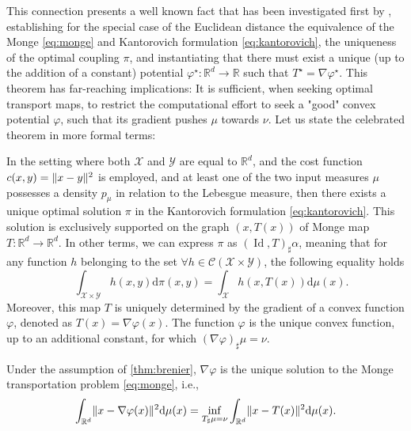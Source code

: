 This connection presents a well known fact that has been investigated first by \citeauthor{brenier1987decomposition}, establishing for the special case of the Euclidean distance the equivalence of the Monge \eqref{eq:monge} and Kantorovich formulation  \eqref{eq:kantorovich}, the uniqueness of the optimal coupling $\pi$, and instantiating that there must exist a unique (up to the addition of a constant) potential $\varphi^\star:\mathbb{R}^d\rightarrow \mathbb{R}$ such that $T^\star = \nabla \varphi^\star$. 
This theorem has far-reaching implications: It is sufficient, when seeking optimal transport maps, to restrict the computational effort to seek a "good" convex potential $\varphi$, such that its gradient pushes $\mu$ towards $\nu$. 
Let us state the celebrated \citeauthor{brenier1987decomposition} theorem \citeyearpar{brenier1987decomposition} in more formal terms:
\begin{theorem} \label{thm:brenier}
	In the setting where both $\mathcal{X}$ and $\mathcal{Y}$ are equal to $\mathbb{R}^d$, and the cost function $c(x, y) = \lVert x-y\rVert^2$ is employed, and at least one of the two input measures $\mu$ possesses a density $p_\mu$ in relation to the Lebesgue measure, then there exists a unique optimal solution $\pi$ in the Kantorovich formulation \eqref{eq:kantorovich}.
	This solution is exclusively supported on the graph $(x, T(x))$ of Monge map $T: \mathbb{R}^d \rightarrow \mathbb{R}^d$.
	In other terms, we can express $\pi$ as $(\operatorname{Id}, T)_{\sharp} \alpha$, meaning that for any function $h$ belonging to the set $\forall h \in \mathcal{C}(\mathcal{X} \times \mathcal{Y})$, the following equality holds
	$$
	\quad \int_{\mathcal{X} \times \mathcal{Y}} h(x, y) \mathrm{d} \pi(x, y)=\int_{\mathcal{X}} h(x, T(x)) \mathrm{d} \mu(x).
	$$
Moreover, this map $T$ is uniquely determined by the gradient of a convex function $\varphi$, denoted as $T(x)=\nabla \varphi(x)$. The function $\varphi$ is the unique convex function, up to an additional constant, for which $(\nabla \varphi)_{\sharp} \mu=\nu$.
\end{theorem}
\begin{corollary}
	Under the assumption of \cref{thm:brenier}, $\nabla \varphi$ is the unique solution to the Monge transportation problem \eqref{eq:monge}, i.e.,
	\begin{equation}
		\int_{\mathbb{R}^d} \lVert x-\nabla \varphi(x)\rVert^2 \mathrm{d}\mu(x) = \inf_{T_\sharp \mu = \nu} \int_{\mathbb{R}^d}\lVert x - T(x)\rVert^2 \mathrm{d}\mu(x).
	\end{equation}
\end{corollary}


